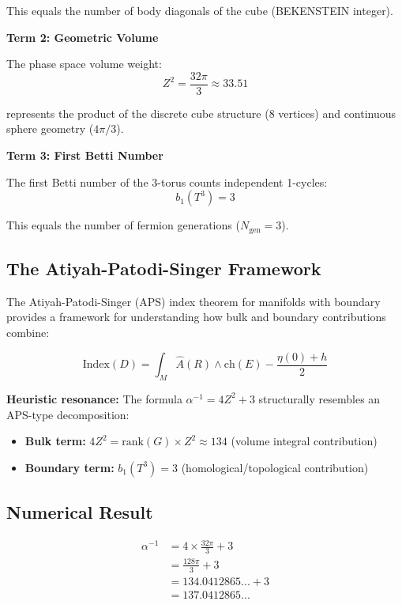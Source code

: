 \documentclass[12pt,a4paper]{article}
\newcommand{\Zsq}{Z^2}
\newcommand{\Ngen}{N_{\text{gen}}}
\begin{document}
This equals the number of body diagonals of the cube (BEKENSTEIN integer).

\textbf{Term 2: Geometric Volume}

The phase space volume weight:
\begin{equation}
\Zsq = \frac{32\pi}{3} \approx 33.51
\end{equation}

represents the product of the discrete cube structure (8 vertices) and continuous sphere geometry ($4\pi/3$).

\textbf{Term 3: First Betti Number}

The first Betti number of the 3-torus counts independent 1-cycles:
\begin{equation}
b_1(T^3) = 3
\end{equation}

This equals the number of fermion generations ($\Ngen = 3$).

\subsection{The Atiyah-Patodi-Singer Framework}

The Atiyah-Patodi-Singer (APS) index theorem for manifolds with boundary provides a framework for understanding how bulk and boundary contributions combine:

\begin{equation}
\text{Index}(D) = \int_M \hat{A}(R) \wedge \text{ch}(E) - \frac{\eta(0) + h}{2}
\end{equation}

\textbf{Heuristic resonance:} The formula $\alpha^{-1} = 4\Zsq + 3$ structurally resembles an APS-type decomposition:
\begin{itemize}
    \item \textbf{Bulk term:} $4\Zsq = \text{rank}(G) \times \Zsq \approx 134$ (volume integral contribution)
    \item \textbf{Boundary term:} $b_1(T^3) = 3$ (homological/topological contribution)
\end{itemize}

\subsection{Numerical Result}

\begin{align}
\alpha^{-1} &= 4 \times \frac{32\pi}{3} + 3 \\
&= \frac{128\pi}{3} + 3 \\
&= 134.0412865... + 3 \\
&= 137.0412865...
\end{align}
\end{document}
